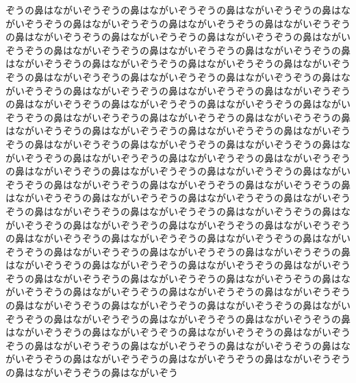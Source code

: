 ぞうの鼻はながいぞうぞうの鼻はながいぞうぞうの鼻はながいぞうぞうの鼻はながいぞうぞうの鼻はながいぞうぞうの鼻はながいぞうぞうの鼻はながいぞうぞうの鼻はながいぞうぞうの鼻はながいぞうぞうの鼻はながいぞうぞうの鼻はながいぞうぞうの鼻はながいぞうぞうの鼻はながいぞうぞうの鼻はながいぞうぞうの鼻はながいぞうぞうの鼻はながいぞうぞうの鼻はながいぞうぞうの鼻はながいぞうぞうの鼻はながいぞうぞうの鼻はながいぞうぞうの鼻はながいぞうぞうの鼻はながいぞうぞうの鼻はながいぞうぞうの鼻はながいぞうぞうの鼻はながいぞうぞうの鼻はながいぞうぞうの鼻はながいぞうぞうの鼻はながいぞうぞうの鼻はながいぞうぞうの鼻はながいぞうぞうの鼻はながいぞうぞうの鼻はながいぞうぞうの鼻はながいぞうぞうの鼻はながいぞうぞうの鼻はながいぞうぞうの鼻はながいぞうぞうの鼻はながいぞうぞうの鼻はながいぞうぞうの鼻はながいぞうぞうの鼻はながいぞうぞうの鼻はながいぞうぞうの鼻はながいぞうぞうの鼻はながいぞうぞうの鼻はながいぞうぞうの鼻はながいぞうぞうの鼻はながいぞうぞうの鼻はながいぞうぞうの鼻はながいぞうぞうの鼻はながいぞうぞうの鼻はながいぞうぞうの鼻はながいぞうぞうの鼻はながいぞうぞうの鼻はながいぞうぞうの鼻はながいぞうぞうの鼻はながいぞうぞうの鼻はながいぞうぞうの鼻はながいぞうぞうの鼻はながいぞうぞうの鼻はながいぞうぞうの鼻はながいぞうぞうの鼻はながいぞうぞうの鼻はながいぞうぞうの鼻はながいぞうぞうの鼻はながいぞうぞうの鼻はながいぞうぞうの鼻はながいぞうぞうの鼻はながいぞうぞうの鼻はながいぞうぞうの鼻はながいぞうぞうの鼻はながいぞうぞうの鼻はながいぞうぞうの鼻はながいぞうぞうの鼻はながいぞうぞうの鼻はながいぞうぞうの鼻はながいぞうぞうの鼻はながいぞうぞうの鼻はながいぞうぞうの鼻はながいぞうぞうの鼻はながいぞうぞうの鼻はながいぞうぞうの鼻はながいぞうぞうの鼻はながいぞうぞうの鼻はながいぞうぞうの鼻はながいぞうぞうの鼻はながいぞうぞうの鼻はながいぞうぞうの鼻はながいぞうぞうの鼻はながいぞうぞうの鼻はながいぞうぞうの鼻はながいぞうぞうの鼻はながいぞうぞうの鼻はながいぞうぞうの鼻はながいぞうぞうの鼻はながいぞうぞうの鼻はながいぞうぞうの鼻はながいぞうぞうの鼻はながいぞうぞうの鼻はながいぞうぞうの鼻はながいぞう





